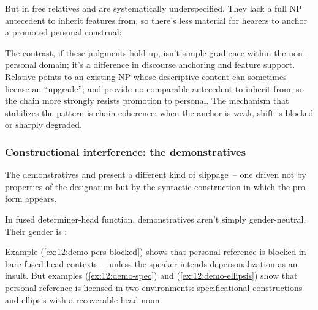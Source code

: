 But  in free relatives and  are systematically underspecified. They lack a full NP antecedent to inherit features from, so there's less material for hearers to anchor a promoted personal construal:

\z
{}
\z
The contrast, if these judgments hold up, isn't simple gradience within the non-personal domain; it's a difference in discourse anchoring and feature support. Relative  points to an existing NP whose descriptive content can sometimes license an \enquote{upgrade};  and  provide no comparable antecedent to inherit from, so the chain more strongly resists promotion to personal. The mechanism that stabilizes the pattern is chain coherence: when the anchor is weak, shift is blocked or sharply degraded.

\subsubsection{Constructional interference: the demonstratives}
\label{sec:12:constructional}

The demonstratives  and  present a different kind of slippage~-- one driven not by properties of the designatum but by the syntactic construction in which the pro-form appears.

In fused determiner-head function, demonstratives aren't simply gender-neutral. Their gender is :

\z
{}
\z
{}
\z

Example (\ref{ex:12:demo-pers-blocked}) shows that personal reference is blocked in bare fused-head contexts~-- unless the speaker intends depersonalization as an insult. But examples (\ref{ex:12:demo-spec}) and (\ref{ex:12:demo-ellipsis}) show that personal reference is licensed in two environments: specificational  constructions and ellipsis with a recoverable head noun.

